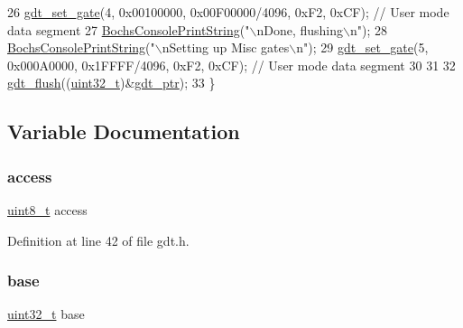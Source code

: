 \begin{DoxyCode}
26     \hyperlink{a00089_abcf0775ea602ace125ae809475b6d8bf_abcf0775ea602ace125ae809475b6d8bf}{gdt\_set\_gate}(4, 0x00100000, 0x00F00000/4096, 0xF2, 0xCF); \textcolor{comment}{// User mode data segment}
27     \hyperlink{a00065_a19e1f554d03c977f8b947f21489daa41_a19e1f554d03c977f8b947f21489daa41}{BochsConsolePrintString}(\textcolor{stringliteral}{"\(\backslash\)nDone, flushing\(\backslash\)n"});
28     \hyperlink{a00065_a19e1f554d03c977f8b947f21489daa41_a19e1f554d03c977f8b947f21489daa41}{BochsConsolePrintString}(\textcolor{stringliteral}{"\(\backslash\)nSetting up Misc gates\(\backslash\)n"});
29     \hyperlink{a00089_abcf0775ea602ace125ae809475b6d8bf_abcf0775ea602ace125ae809475b6d8bf}{gdt\_set\_gate}(5, 0x000A0000, 0x1FFFF/4096, 0xF2, 0xCF); \textcolor{comment}{// User mode data segment}
30 
31 
32     \hyperlink{a00092_a62397fecbde23244b570ae632fe926fa_a62397fecbde23244b570ae632fe926fa}{gdt\_flush}((\hyperlink{a00125_a435d1572bf3f880d55459d9805097f62_a435d1572bf3f880d55459d9805097f62}{uint32\_t})&\hyperlink{a00092_ab0888c07dfb9352ef76d05e63464cf0b_ab0888c07dfb9352ef76d05e63464cf0b}{gdt\_ptr});
33 \}
\end{DoxyCode}


\subsection{Variable Documentation}
\mbox{\label{a00092_a8b0d6200bc639dd37ff68847a0adde5f_a8b0d6200bc639dd37ff68847a0adde5f}} 
\subsubsection{\texorpdfstring{access}{access}}
{\footnotesize\ttfamily \hyperlink{a00125_aba7bc1797add20fe3efdf37ced1182c5_aba7bc1797add20fe3efdf37ced1182c5}{uint8\+\_\+t} access}



Definition at line 42 of file gdt.\+h.

\mbox{\label{a00092_a0523cedff47e2441fc198b7770ec5d3f_a0523cedff47e2441fc198b7770ec5d3f}} 
\subsubsection{\texorpdfstring{base}{base}}
{\footnotesize\ttfamily \hyperlink{a00125_a435d1572bf3f880d55459d9805097f62_a435d1572bf3f880d55459d9805097f62}{uint32\+\_\+t} base}



